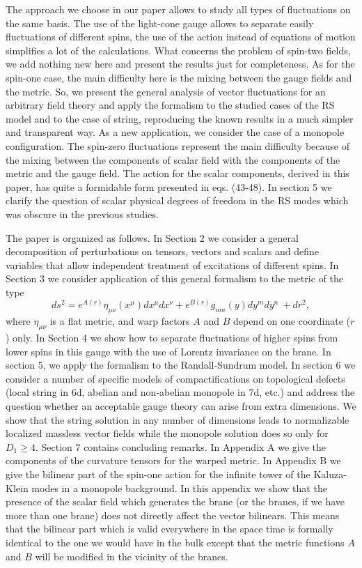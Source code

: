 \documentclass[a4paper,12pt]{article}
\begin{document}
The approach we choose in our paper allows to study all types of
fluctuations on the same basis. The use of the light-cone gauge
allows to separate easily fluctuations of different spins, the use of
the action instead of equations of motion simplifies a lot of the
calculations. What concerns the problem of spin-two fields, we add
nothing new here and present the results just for completeness. As
for the spin-one case, the main difficulty here is the mixing between
the gauge fields and the metric. So, we present the general analysis
of vector fluctuations for an arbitrary field theory  and apply the
formalism to the studied cases of the RS model  and to the case of 
string, reproducing the known results in a much simpler and
transparent way. As a new application, we consider the case of a
monopole configuration.  The spin-zero fluctuations represent the
main difficulty because of the mixing between the components of
scalar field with the components of the metric and the gauge field.
The action for the scalar components, derived in this paper, has
quite a formidable form presented in eqs. (43-48). In section 5 we
clarify the question of scalar physical degrees of freedom in the RS
modes which was obscure in the previous studies.

The paper is organized as follows. In Section 2 we consider a general
decomposition of perturbations on tensors, vectors and scalars and
define variables that allow independent treatment of excitations of
different spins. In  Section 3 we consider application of this
general formalism to the metric of the type
\begin{equation}
ds^2 =
e^{A(r)}\eta_{\mu\nu}(x^\mu)dx^\mu dx^\nu + e^{B(r)} g_{mn}(y)dy^m
dy^n~+dr^2,
\label{simpl}
\end{equation}
where $\eta_{\mu\nu}$ is a flat metric, and warp factors $A$ and $B$
depend on one coordinate ($r$) only.  In Section 4 we show how to
separate fluctuations of higher spins from lower spins in this gauge
with the use of Lorentz invariance on the brane. In section 5, we
apply the formalism to the Randall-Sundrum model. In section 6 we
consider a number of specific models of compactifications on
topological defects (local string in 6d, abelian and non-abelian
monopole in 7d, etc.)  and address the question whether an acceptable
gauge theory can arise from extra dimensions. We show that the string
solution in any number of dimensions leads to normalizable localized
massless vector fields while the monopole solution does so only for
$D_1\geq 4$. Section 7 contains concluding remarks. In Appendix A we
give the components of the curvature tensors for the warped metric.
In Appendix B we give the bilinear part of the spin-one action for
the infinite tower of the Kaluza-Klein modes in a monopole
background. In this appendix we show that the presence of the scalar
field which generates the brane (or the branes, if we have more than
one brane) does not directly affect the vector bilinears. This means
that the bilinear part which is valid everywhere in the space time is
formally identical to the one we would have in the bulk except that
the metric functions $A$ and $B$ will be modified in the vicinity of
the branes.
\end{document}
